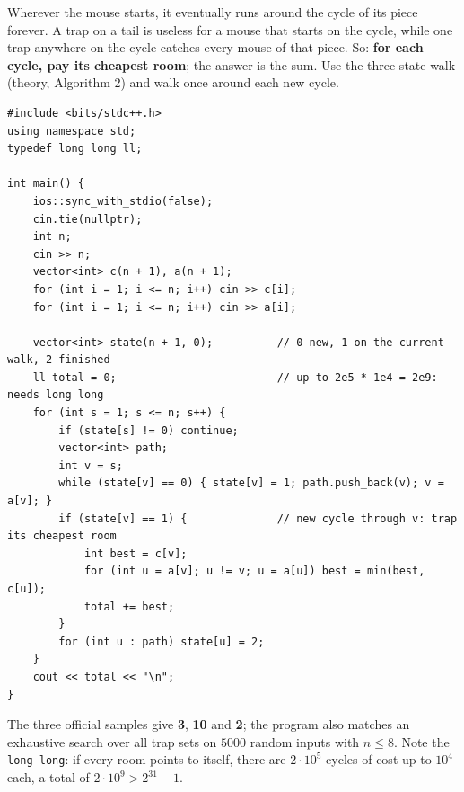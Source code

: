 \begin{solutionbox}
Wherever the mouse starts, it eventually runs around the cycle of its piece forever. A trap on a tail is useless for a mouse that starts on the cycle, while one trap anywhere on the cycle catches every mouse of that piece. So: \textbf{for each cycle, pay its cheapest room}; the answer is the sum. Use the three-state walk (theory, Algorithm 2) and walk once around each new cycle.
\begin{lstlisting}[style=cpp]
#include <bits/stdc++.h>
using namespace std;
typedef long long ll;

int main() {
    ios::sync_with_stdio(false);
    cin.tie(nullptr);
    int n;
    cin >> n;
    vector<int> c(n + 1), a(n + 1);
    for (int i = 1; i <= n; i++) cin >> c[i];
    for (int i = 1; i <= n; i++) cin >> a[i];

    vector<int> state(n + 1, 0);          // 0 new, 1 on the current walk, 2 finished
    ll total = 0;                         // up to 2e5 * 1e4 = 2e9: needs long long
    for (int s = 1; s <= n; s++) {
        if (state[s] != 0) continue;
        vector<int> path;
        int v = s;
        while (state[v] == 0) { state[v] = 1; path.push_back(v); v = a[v]; }
        if (state[v] == 1) {              // new cycle through v: trap its cheapest room
            int best = c[v];
            for (int u = a[v]; u != v; u = a[u]) best = min(best, c[u]);
            total += best;
        }
        for (int u : path) state[u] = 2;
    }
    cout << total << "\n";
}
\end{lstlisting}
The three official samples give \textbf{3}, \textbf{10} and \textbf{2}; the program also matches an exhaustive search over all trap sets on $5000$ random inputs with $n \le 8$. Note the \texttt{long long}: if every room points to itself, there are $2\cdot10^5$ cycles of cost up to $10^4$ each, a total of $2\cdot10^9 > 2^{31}-1$.
\end{solutionbox}

